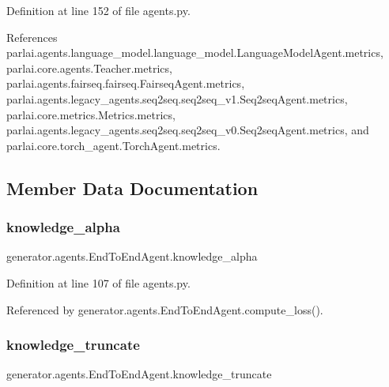 Definition at line 152 of file agents.\+py.



References parlai.\+agents.\+language\+\_\+model.\+language\+\_\+model.\+Language\+Model\+Agent.\+metrics, parlai.\+core.\+agents.\+Teacher.\+metrics, parlai.\+agents.\+fairseq.\+fairseq.\+Fairseq\+Agent.\+metrics, parlai.\+agents.\+legacy\+\_\+agents.\+seq2seq.\+seq2seq\+\_\+v1.\+Seq2seq\+Agent.\+metrics, parlai.\+core.\+metrics.\+Metrics.\+metrics, parlai.\+agents.\+legacy\+\_\+agents.\+seq2seq.\+seq2seq\+\_\+v0.\+Seq2seq\+Agent.\+metrics, and parlai.\+core.\+torch\+\_\+agent.\+Torch\+Agent.\+metrics.



\subsection{Member Data Documentation}
\mbox{\label{classgenerator_1_1agents_1_1EndToEndAgent_a4102dc419ed9e709b2fa4561f2f58ac7}} 
\subsubsection{\texorpdfstring{knowledge\+\_\+alpha}{knowledge\_alpha}}
{\footnotesize\ttfamily generator.\+agents.\+End\+To\+End\+Agent.\+knowledge\+\_\+alpha}



Definition at line 107 of file agents.\+py.



Referenced by generator.\+agents.\+End\+To\+End\+Agent.\+compute\+\_\+loss().

\mbox{\label{classgenerator_1_1agents_1_1EndToEndAgent_aac7481a637d9b04a437dcc5ce3f46e17}} 
\subsubsection{\texorpdfstring{knowledge\+\_\+truncate}{knowledge\_truncate}}
{\footnotesize\ttfamily generator.\+agents.\+End\+To\+End\+Agent.\+knowledge\+\_\+truncate}



